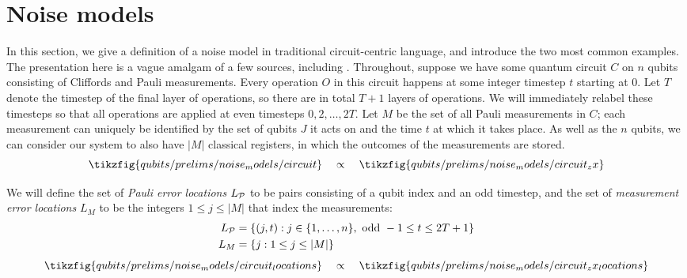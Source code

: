 \section{Noise models}\label{sec:noise-models}

In this section, we give a definition of a noise model in traditional circuit-centric language, and introduce the two most common examples.
The presentation here is a vague amalgam of a few sources, including .
Throughout, suppose we have some quantum circuit $C$ on $n$ qubits consisting of Cliffords and Pauli measurements.
Every operation $O$ in this circuit happens at some integer timestep $t$ starting at $0$.
Let $T$ denote the timestep of the final layer of operations, so there are in total $T+1$ layers of operations.
We will immediately relabel these timesteps so that all operations are applied at even timesteps $0, 2, \ldots, 2T$.
Let $M$ be the set of all Pauli measurements in $C$; each measurement can uniquely be identified by the set of qubits $J$ it acts on and the time $t$ at which it takes place.
As well as the $n$ qubits, we can consider our system to also have $|M|$ classical registers, in which the outcomes of the measurements are stored.
\begin{equation}
    \tikzfig{qubits/prelims/noise_models/circuit}
    \quad \propto \quad
    \tikzfig{qubits/prelims/noise_models/circuit_zx}
\end{equation}

We will define the set of \textit{Pauli error locations} $L_{\mathcal{P}}$ to be pairs consisting of a qubit index and an odd timestep, and the set of \textit{measurement error locations} $L_M$ to be the integers $1 \leq j \leq |M|$ that index the measurements:
\begin{equation}\label{eq:pauli_and_measurement_error_locations}
    \begin{aligned}
        L_{\mathcal{P}} &= \{(j, t) : j \in \{1, \ldots, n\}, \text{ odd } -1 \leq t \leq 2T+1\} \\
        L_M &= \{j : 1 \leq j \leq |M|\}
    \end{aligned}
\end{equation}
\begin{equation}
    \tikzfig{qubits/prelims/noise_models/circuit_locations}
    \quad \propto \quad
    \tikzfig{qubits/prelims/noise_models/circuit_zx_locations}
\end{equation}

